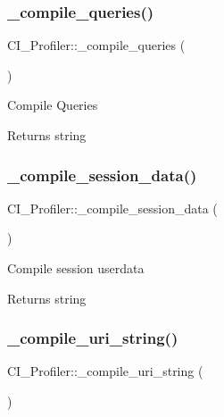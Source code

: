 \subsubsection{\texorpdfstring{\+\_\+compile\+\_\+queries()}{\_compile\_queries()}}
{\footnotesize\ttfamily C\+I\+\_\+\+Profiler\+::\+\_\+compile\+\_\+queries (\begin{DoxyParamCaption}{ }\end{DoxyParamCaption})\hspace{0.3cm}{\ttfamily [protected]}}

Compile Queries

\begin{DoxyReturn}{Returns}
string 
\end{DoxyReturn}
\mbox{\label{class_c_i___profiler_a4b7fc4d0c796ae249071ff818abd559b}} 
\subsubsection{\texorpdfstring{\+\_\+compile\+\_\+session\+\_\+data()}{\_compile\_session\_data()}}
{\footnotesize\ttfamily C\+I\+\_\+\+Profiler\+::\+\_\+compile\+\_\+session\+\_\+data (\begin{DoxyParamCaption}{ }\end{DoxyParamCaption})\hspace{0.3cm}{\ttfamily [protected]}}

Compile session userdata

\begin{DoxyReturn}{Returns}
string 
\end{DoxyReturn}
\mbox{\label{class_c_i___profiler_ad44a165ff25148b77345c81149b636b5}} 
\subsubsection{\texorpdfstring{\+\_\+compile\+\_\+uri\+\_\+string()}{\_compile\_uri\_string()}}
{\footnotesize\ttfamily C\+I\+\_\+\+Profiler\+::\+\_\+compile\+\_\+uri\+\_\+string (\begin{DoxyParamCaption}{ }\end{DoxyParamCaption})\hspace{0.3cm}{\ttfamily [protected]}}


